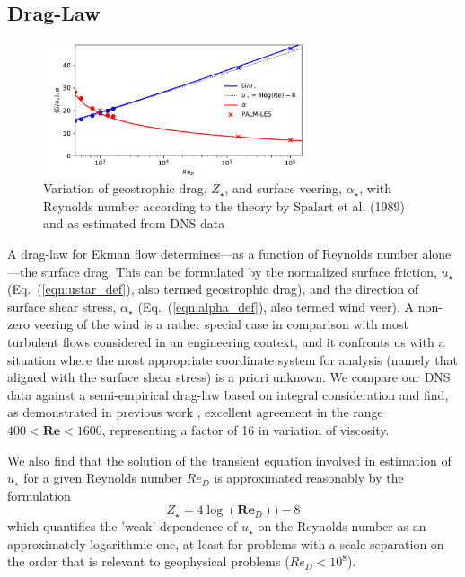 \documentclass[smallcondensed,final]{svjour3}
\begin{document}
\subsection{Drag-Law}
\label{sec:drag-law}
\begin{figure}
  \centerline{\includegraphics[width=0.7\textwidth]{../plot/ustar_alpha.pdf}}
  \caption{Variation of geostrophic drag, $Z_\star$, and surface veering, $\alpha_\star$, with Reynolds number according to
    the theory by Spalart et al. (1989) and as estimated from DNS data
    \label{fig:drag_law}}
\end{figure}
A drag-law for Ekman flow determines---as a function of Reynolds number alone---the surface drag.
%
This can be formulated by the normalized surface friction, $u_\star$ (Eq.~(\ref{eqn:ustar_def}), also termed geostrophic drag), 
and the direction of surface shear stress, $\alpha_\star$ (Eq.~(\ref{eqn:alpha_def}), also termed wind veer). 
%
A non-zero veering of the wind is a rather special case in comparison with most turbulent flows considered in an
engineering context, and it confronts us with a situation where the most appropriate coordinate system
for analysis (namely that aligned with the surface shear stress) is a priori unknown. 
%
We compare our DNS data against a semi-empirical drag-law based on integral consideration \citep{spalart:JFM1989}
and find, as demonstrated in previous work \citep{ansorge:BM2014}, excellent agreement in the range
 $400<\mathbf{Re}<1600$, representing a factor of 16 in variation of viscosity. 
%
\par
%
We also find that the solution of the transient equation involved in estimation of $u_\star$ for a given Reynolds number
$Re_D$ is approximated reasonably by the formulation
\begin{equation}
  Z_\star= 4\log(\mathbf{Re}_D))-8
  \label{eqn:zstar}
\end{equation}
which quantifies the 'weak' dependence of $u_\star$ on the Reynolds number as an approximately logarithmic one, at least
for problems with a scale separation on the order that is relevant to geophysical problems ($Re_D<10^{8}$).  
%
%
\end{document}
